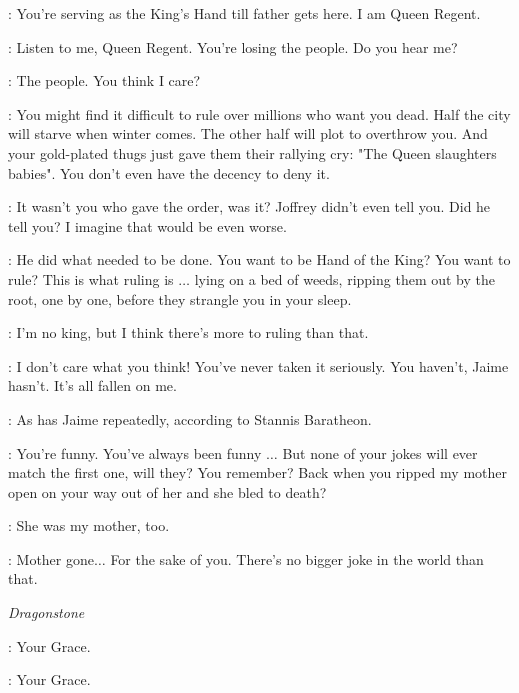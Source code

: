 \CERSEI: You're serving as the King's Hand till father gets here. I am Queen Regent.

\TYRION: Listen to me, Queen Regent. You're losing the people. Do you hear me?


\CERSEI: The people. You think I care?

\TYRION: You might find it difficult to rule over millions who want you dead. Half the city will starve when winter comes. The other half will plot to overthrow you. And your gold-plated thugs just gave them their rallying cry: "The Queen slaughters babies". You don't even have the decency to deny it.


\TYRION: It wasn't you who gave the order, was it? Joffrey didn't even tell you. Did he tell you? I imagine that would be even worse.

\CERSEI: He did what needed to be done. You want to be Hand of the King? You want to rule? This is what ruling is $\ldots$ lying on a bed of weeds, ripping them out by the root, one by one, before they strangle you in your sleep.

\TYRION: I'm no king, but I think there's more to ruling than that.

\CERSEI: I don't care what you think! You've never taken it seriously. You haven't, Jaime hasn't. It's all fallen on me.

\TYRION: As has Jaime repeatedly, according to Stannis Baratheon.

\CERSEI: You're funny. You've always been funny $\ldots$ But none of your jokes will ever match the first one, will they? You remember? Back when you ripped my mother open on your way out of her and she bled to death?

\TYRION: She was my mother, too.

\CERSEI: Mother gone$\ldots$ For the sake of you. There's no bigger joke in the world than that.



\scene

\textit{Dragonstone}


\DAVOS: Your Grace.

\MATTHOS: Your Grace.

